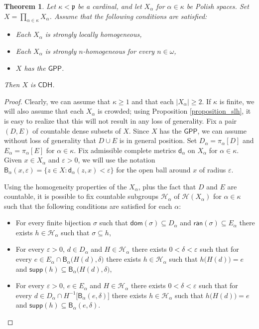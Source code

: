 \documentclass{amsart}
\theoremstyle{plain}
\newtheorem{theorem}{Theorem}[section]
\theoremstyle{definition}
\newcommand{\dom}{\mathsf{dom}}
\newcommand{\ran}{\mathsf{ran}}
\newcommand{\di}{\mathsf{d}}
\newcommand{\Ball}{\mathsf{B}}
\newcommand{\supp}{\mathsf{supp}}
\newcommand{\CDH}{\mathsf{CDH}}
\newcommand{\GPP}{\mathsf{GPP}}
\newcommand{\HH}{\mathcal{H}}
\newcommand{\pppp}{\mathfrak{p}}
\begin{document}
\begin{theorem}\label{theorem_main}
Let $\kappa<\pppp$ be a cardinal, and let $X_\alpha$ for $\alpha\in\kappa$ be Polish spaces. Set $X=\prod_{\alpha\in\kappa}X_\alpha$. Assume that the following conditions are satisfied:
\begin{itemize}
\item Each $X_\alpha$ is strongly locally homogeneous,
\item Each $X_\alpha$ is strongly $n$-homogeneous for every $n\in\omega$,
\item $X$ has the $\GPP$.
\end{itemize}
Then $X$ is $\CDH$.
\end{theorem}
\begin{proof}
Clearly, we can assume that $\kappa\geq 1$ and that each $|X_\alpha|\geq 2$. If $\kappa$ is finite, we will also assume that each $X_\alpha$ is crowded; using Proposition \ref{proposition_slh}, it is easy to realize that this will not result in any loss of generality. Fix a pair $(D,E)$ of countable dense subsets of $X$. Since $X$ has the $\GPP$, we can assume without loss of generality that $D\cup E$ is in general position. Set $D_\alpha=\pi_\alpha[D]$ and $E_\alpha=\pi_\alpha[E]$ for $\alpha\in\kappa$. Fix admissible complete metrics $\di_\alpha$ on $X_\alpha$ for $\alpha\in\kappa$. Given $x\in X_\alpha$ and $\varepsilon >0$, we will use the notation $\Ball_\alpha(x,\varepsilon)=\{z\in X:\di_\alpha(z,x)<\varepsilon\}$ for the open ball around $x$ of radius $\varepsilon$.

Using the homogeneity properties of the $X_\alpha$, plus the fact that $D$ and $E$ are countable, it is possible to fix countable subgroups $\HH_\alpha$ of $\HH(X_\alpha)$ for $\alpha\in\kappa$ such that the following conditions are satisfied for each $\alpha$:
\begin{itemize}
\item[(1)] For every finite bijection $\sigma$ such that $\dom(\sigma)\subseteq D_\alpha$ and $\ran(\sigma)\subseteq E_\alpha$ there exists $h\in\HH_\alpha$ such that $\sigma\subseteq h$,
\item[(2)] For every $\varepsilon >0$, $d\in D_\alpha$ and $H\in\HH_\alpha$ there exists $0<\delta <\varepsilon$ such that for every $e\in E_\alpha\cap\Ball_\alpha\big(H(d),\delta\big)$ there exists $h\in\HH_\alpha$ such that $h\big(H(d)\big)=e$ and $\supp(h)\subseteq\Ball_\alpha\big(H(d),\delta\big)$,
\item[(3)] For every $\varepsilon >0$, $e\in E_\alpha$ and $H\in\HH_\alpha$ there exists $0<\delta <\varepsilon$ such that for every $d\in D_\alpha\cap H^{-1}\big[\Ball_\alpha(e,\delta)\big]$ there exists $h\in\HH_\alpha$ such that $h\big(H(d)\big)=e$ and $\supp(h)\subseteq\Ball_\alpha(e,\delta)$.
\end{itemize}


\end{proof}
\end{document}
